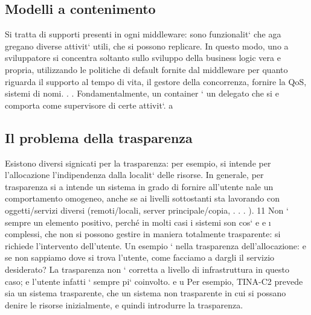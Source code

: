\documentclass[a4paper,12pt]{article}
\begin{document}
\subsection{Modelli a contenimento}
Si tratta di supporti presenti in ogni middleware: sono funzionalit` che aga
gregano diverse attivit` utili, che si possono replicare. In questo modo, uno
a
sviluppatore si concentra soltanto sullo sviluppo della business logic vera e
propria, utilizzando le politiche di default fornite dal middleware per quanto
riguarda il supporto al tempo di vita, il gestore della concorrenza, fornire la
QoS, sistemi di nomi. . . Fondamentalmente, un container ` un delegato che si
e
comporta come supervisore di certe attivit`.
a
\subsection{Il problema della trasparenza}
Esistono diversi signicati per la trasparenza: per esempio, si intende per l'allocazione l'indipendenza dalla localit`
delle risorse. In generale, per trasparenza si
a
intende un sistema in grado di fornire all'utente nale un comportamento omogeneo, anche se ai livelli sottostanti sta
lavorando con oggetti/servizi diversi
(remoti/locali, server principale/copia, . . . ).
11
\newpage
Non ` sempre un elemento positivo, perché in molti casi i sistemi son cos`
e
e
\i{}
complessi, che non si possono gestire in maniera totalmente trasparente: si
richiede l'intervento dell'utente. Un esempio ` nella trasparenza dell'allocazione:
e
se non sappiamo dove si trova l'utente, come facciamo a dargli il servizio desiderato? La trasparenza non ` corretta a
livello di infrastruttura in questo caso;
e
l'utente infatti ` sempre pi` coinvolto.
e
u
Per esempio, TINA-C2 prevede sia un sistema trasparente, che un sistema
non trasparente in cui si possano denire le risorse inizialmente, e quindi introdurre la trasparenza.
\end{document}
